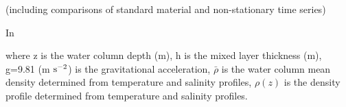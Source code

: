 (including comparisons of standard material and non-stationary time series)  











In














\noindent where z is the water column depth (m), h is the mixed layer thickness (m), g=9.81 (m $\rm s^{-2}$) is the gravitational acceleration, $\bar{\rho}$ is the water column mean density determined from temperature and salinity profiles, $\rho(z)$ is the density profile determined from temperature and salinity 
profiles. 